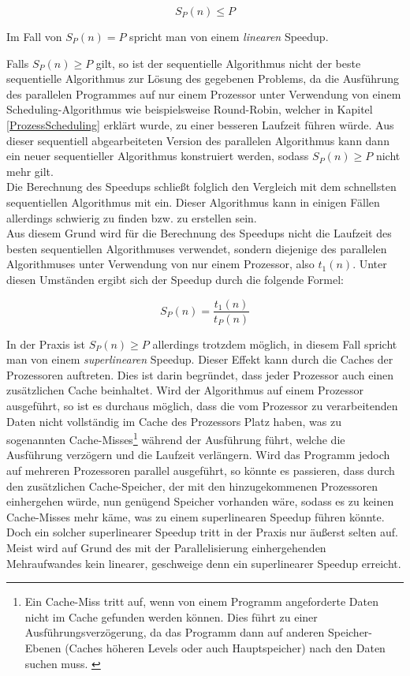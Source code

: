				\[ S_P(n) \leq P \]
				
				Im Fall von \(S_P(n) = P\) spricht man von einem \textit{linearen} Speedup.
				
				Falls \(S_P(n) \geq P\) gilt, so ist der sequentielle Algorithmus nicht der beste sequentielle Algorithmus zur Lösung des gegebenen Problems, da die Ausführung des parallelen Programmes auf nur einem Prozessor unter Verwendung von einem Scheduling-Algorithmus wie beispielsweise Round-Robin, welcher in Kapitel \ref{ProzessScheduling} erklärt wurde, zu einer besseren Laufzeit führen würde. Aus dieser sequentiell abgearbeiteten Version des parallelen Algorithmus kann dann ein neuer sequentieller Algorithmus konstruiert werden, sodass \(S_P(n) \geq P\) nicht mehr gilt.\\
				Die Berechnung des Speedups schließt folglich den Vergleich mit dem schnellsten sequentiellen Algorithmus mit ein. Dieser Algorithmus kann in einigen Fällen allerdings schwierig zu finden bzw. zu erstellen sein.\\
				Aus diesem Grund wird für die Berechnung des Speedups nicht die Laufzeit des besten sequentiellen Algorithmuses verwendet, sondern diejenige des parallelen Algorithmuses unter Verwendung von nur einem Prozessor, also $t_1(n)$.
				Unter diesen Umständen ergibt sich der Speedup durch die folgende Formel:
				
				\[ S_P(n) = \frac{t_1(n)}{t_P(n)} \]
				
				In der Praxis ist \(S_P(n) \geq P\) allerdings trotzdem möglich, in diesem Fall spricht man von einem \textit{superlinearen} Speedup. Dieser Effekt kann durch die Caches der Prozessoren auftreten. Dies ist darin begründet, dass jeder Prozessor auch einen zusätzlichen Cache beinhaltet. Wird der Algorithmus auf einem Prozessor ausgeführt, so ist es durchaus möglich, dass die vom Prozessor zu verarbeitenden Daten nicht vollständig im Cache des Prozessors Platz haben, was zu sogenannten Cache-Misses\footnote{Ein Cache-Miss tritt auf, wenn von einem Programm angeforderte Daten nicht im Cache gefunden werden können. Dies führt zu einer Ausführungsverzögerung, da das Programm dann auf anderen Speicher-Ebenen (Caches höheren Levels oder auch Hauptspeicher) nach den Daten suchen muss. \cite{CacheMissTechopedia}} während der Ausführung führt, welche die Ausführung verzögern und die Laufzeit verlängern. Wird das Programm jedoch auf mehreren Prozessoren parallel ausgeführt, so könnte es passieren, dass durch den zusätzlichen Cache-Speicher, der mit den hinzugekommenen Prozessoren einhergehen würde, nun genügend Speicher vorhanden wäre, sodass es zu keinen Cache-Misses mehr käme, was zu einem superlinearen Speedup führen könnte.\\
				Doch ein solcher superlinearer Speedup tritt in der Praxis nur äußerst selten auf. Meist wird auf Grund des mit der Parallelisierung einhergehenden Mehraufwandes kein linearer, geschweige denn ein superlinearer Speedup erreicht.

